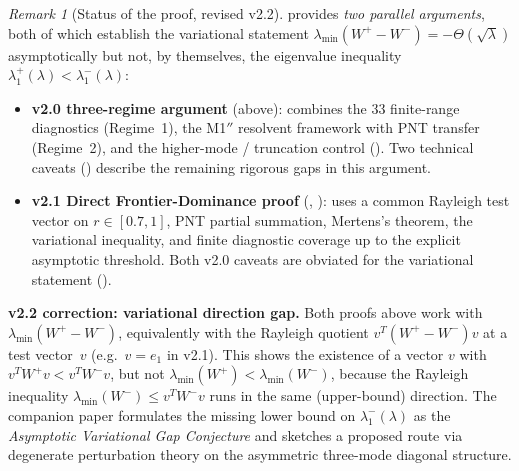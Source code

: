 \documentclass[12pt,a4paper]{article}
\theoremstyle{definition}
\theoremstyle{remark}
\newtheorem{remark}[theorem]{Remark}
\begin{document}
\begin{remark}[Status of the proof, revised v2.2]
\label{rem:M1-status}
 provides \emph{two parallel arguments}, both of which establish
the variational statement $\lambda_{\min}(W^+-W^-)=-\Theta(\sqrt\lambda)$
asymptotically but not, by themselves, the eigenvalue inequality
$\lambda_1^+(\lambda)<\lambda_1^-(\lambda)$:
\begin{itemize}
  \item \textbf{v2.0 three-regime argument} (above): combines the $33$ finite-range diagnostics (Regime~1), the M1$''$ resolvent framework with PNT transfer (Regime~2), and the higher-mode / truncation control (). Two technical caveats () describe the remaining rigorous gaps in this argument.
  \item \textbf{v2.1 Direct Frontier-Dominance proof} (, ): uses a common Rayleigh test vector on $r\in[0.7,1]$, PNT partial summation, Mertens's theorem, the variational inequality, and finite diagnostic coverage up to the explicit asymptotic threshold. Both v2.0 caveats are obviated for the variational statement ().
\end{itemize}

\medskip\noindent
\textbf{v2.2 correction: variational direction gap.}  Both proofs above
work with $\lambda_{\min}(W^+-W^-)$, equivalently with the Rayleigh
quotient $v^T(W^+-W^-)v$ at a test vector~$v$ (e.g.\ $v=e_1$ in v2.1).
This shows the existence of a vector $v$ with $v^T W^+ v < v^T W^- v$,
but not $\lambda_{\min}(W^+) < \lambda_{\min}(W^-)$, because the
Rayleigh inequality $\lambda_{\min}(W^-) \le v^T W^- v$ runs in the same
(upper-bound) direction.  The companion paper \cite{Geiger2026evendom}
formulates the missing lower bound on $\lambda_1^-(\lambda)$ as the
\emph{Asymptotic Variational Gap Conjecture} and sketches a proposed
route via degenerate perturbation theory on the asymmetric three-mode
diagonal structure.


\end{remark}
\end{document}
